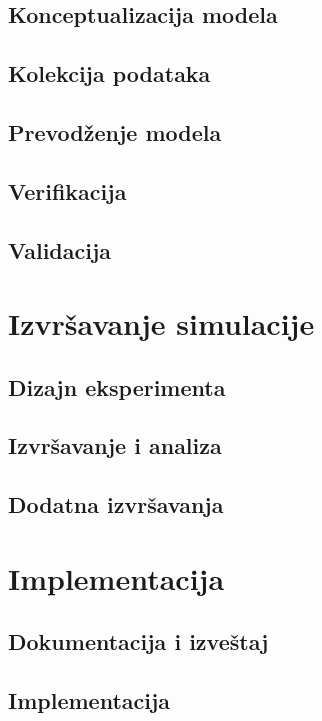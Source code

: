 \documentclass[a4paper,11pt]{book}
\begin{document}
\section{Konceptualizacija modela}

\section{Kolekcija podataka}

\section{Prevodženje modela}

\section{Verifikacija}

\section{Validacija}

\chapter{Izvršavanje simulacije}

\section{Dizajn eksperimenta}

\section{Izvršavanje i analiza}

\section{Dodatna izvršavanja}

\chapter{Implementacija}

\section{Dokumentacija i izveštaj}

\section{Implementacija}
\end{document}
